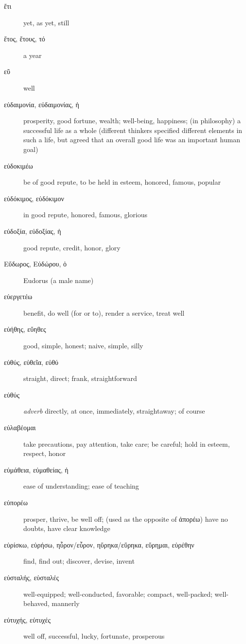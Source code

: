 \documentclass[12pt,letterpaper]{article}
\begin{document}
\begin{description}
    \item[\textgreek{ἔτι}] \marginnote{*}yet, as yet, still
    \item[\textgreek{ἔτος, ἔτους, τό}] \marginnote{*}a year
    \item[\textgreek{εῦ}] \marginnote{*}well
    \item[\textgreek{εὐδαιμονία, εὐδαιμονίας, ἡ}] prosperity, good fortune, wealth; well-being, happiness; (in philosophy) a successful life as a whole (different thinkers specified different elements in such a life, but agreed that an overall good life was an important human goal)
    \item[\textgreek{εὐδοκιμέω}] be of good repute, to be held in esteem, honored, famous, popular
    \item[\textgreek{εὐδόκιμος, εὐδόκιμον}] in good repute, honored, famous, glorious
    \item[\textgreek{εὐδοξία, εὐδοξίας, ἡ}] good repute, credit, honor, glory
    \item[\textgreek{Εὔδωρος, Εὐδώρου, ὁ}] Eudorus (a male name)
    \item[\textgreek{εὐεργετέω}] benefit, do well (for or to), render a service, treat well
    \item[\textgreek{εὐήθης, εὔηθες}] good, simple, honest; naive, simple, silly
    \item[\textgreek{εὐθύς, εὐθεῖα, εὐθύ}] \marginnote{*}straight, direct; frank, straightforward
    \item[\textgreek{εὐθύς}] \marginnote{*}\textit{adverb} directly, at once, immediately, straightaway; of course
    \item[\textgreek{εὐλαβέομαι}] take precautions, pay attention, take care; be careful; hold in esteem, respect, honor
    \item[\textgreek{εὐμάθεια, εὐμαθείας, ἡ}] ease of understanding; ease of teaching
    \item[\textgreek{εὐπορέω}] prosper, thrive, be well off; (used as the opposite of \textgreek{ἀπορέω}) have no doubts, have clear knowledge
    \item[\textgreek{εὑρίσκω, εὑρήσω, ηὗρον/εὗρον, ηὕρηκα/εὕρηκα, εὕρημαι, εὑρέθην}] \marginnote{*}find, find out; discover, devise, invent
    \item[\textgreek{εὐσταλής, εὐσταλές}] well-equipped; well-conducted, favorable; compact, well-packed; well-behaved, mannerly
    \item[\textgreek{εὐτυχής, εὐτυχές}] well off, successful, lucky, fortunate, prosperous

\end{description}
\end{document}

